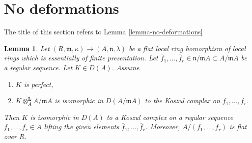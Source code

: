 \documentclass{stacks-project}
\theoremstyle{plain}
\newtheorem{lemma}[subsection]{Lemma}
\theoremstyle{definition}
\theoremstyle{remark}
\numberwithin{equation}{subsection}
\begin{document}
\section{No deformations}
\label{section-no-deformations}

\noindent
The title of this section refers to Lemma \ref{lemma-no-deformations}

\begin{lemma}
\label{lemma-deform-koszul}
Let $(R, \mathfrak m, \kappa) \to (A, \mathfrak n, \lambda)$
be a flat local ring homorphism of local rings
which is essentially of finite presentation.
Let $\overline{f}_1, \ldots, \overline{f}_r \in \mathfrak n/\mathfrak m A
\subset A/\mathfrak m A$ be a regular sequence. Let $K \in D(A)$. Assume
\begin{enumerate}
\item $K$ is perfect,
\item $K \otimes_A^\mathbf{L} A/\mathfrak m A$ is isomorphic in
$D(A/\mathfrak m A)$ to the
Koszul complex on $\overline{f}_1, \ldots, \overline{f}_r$.
\end{enumerate}
Then $K$ is isomorphic in $D(A)$ to a Koszul complex on a regular sequence
$f_1, \ldots, f_r \in A$ lifting the given elements
$\overline{f}_1, \ldots, \overline{f}_r$. Moreover, $A/(f_1, \ldots, f_r)$
is flat over $R$.
\end{lemma}
\end{document}
